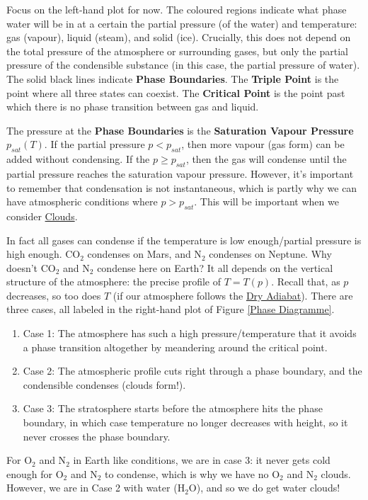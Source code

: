 Focus on the left-hand plot for now. The coloured regions indicate what phase water will be in at a certain the partial pressure (of the water) and temperature: gas (vapour), liquid (steam), and solid (ice). Crucially, this does not depend on the total pressure of the atmosphere or surrounding gases, but only the partial pressure of the condensible substance (in this case, the partial pressure of water). The solid black lines indicate \textbf{Phase Boundaries}. The \textbf{Triple Point} is the point where all three states can coexist. The \textbf{Critical Point} is the point past which there is no phase transition between gas and liquid.

The pressure at the \textbf{Phase Boundaries} is the \textbf{Saturation Vapour Pressure} $p_{sat}(T)$. If the partial pressure $p<p_{sat}$, then more vapour (gas form) can be added without condensing. If the $p\geq p_{sat}$, then the gas will condense until the partial pressure reaches the saturation vapour pressure. However, it's important to remember that condensation is not instantaneous, which is partly why we can have atmospheric conditions where $p>p_{sat}$. This will be important when we consider \hyperref[Clouds]{Clouds}.

In fact all gases can condense if the temperature is low enough/partial pressure is high enough. CO$_2$ condenses on Mars, and N$_2$ condenses on Neptune. Why doesn't CO$_2$ and N$_2$ condense here on Earth? It all depends on the vertical structure of the atmosphere: the precise profile of $T=T(p)$. Recall that, as $p$ decreases, so too does $T$ (if our atmosphere follows the \hyperref[Dry Adiabat]{Dry Adiabat}). There are three cases, all labeled in the right-hand plot of Figure \ref{Phase Diagramme}.

\begin{enumerate}
    \item Case 1: The atmosphere has such a high pressure/temperature that it avoids a phase transition altogether by meandering around the critical point.
    \item Case 2: The atmospheric profile cuts right through a phase boundary, and the condensible condenses (clouds form!).
    \item Case 3: The stratosphere starts before the atmosphere hits the phase boundary, in which case temperature no longer decreases with height, so it never crosses the phase boundary.
\end{enumerate}

For O$_2$ and N$_2$ in Earth like conditions, we are in case 3: it never gets cold enough for O$_2$ and N$_2$ to condense, which is why we have no O$_2$ and N$_2$ clouds. However, we are in Case 2 with water (H$_2$O), and so we do get water clouds!

